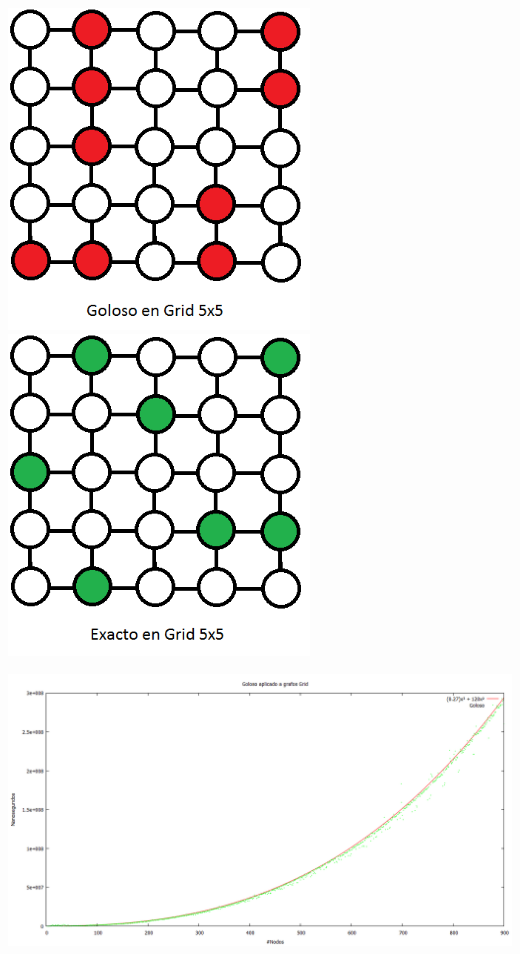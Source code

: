 \includegraphics[width=8cm]{./graficos/grid_5x5_goloso.png}
\includegraphics[width=8cm]{./graficos/grid_5x5_exacto.png}


\begin {center}
\includegraphics[width=19cm]{./graficos/goloso-900nodos.png}
\end {center} 

